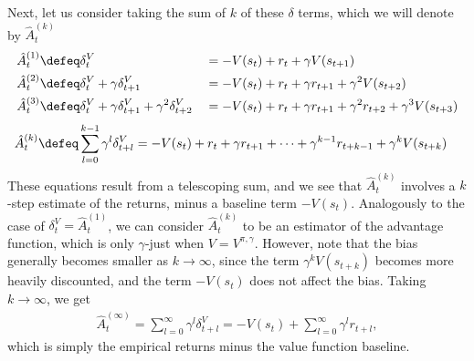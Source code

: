 \documentclass{article}
\newcommand{\dv}{\delta^V}
\newcommand{\hata}{\hat{A}}
\newcommand{\delay}{l}
\newcommand{\Vpigam}{V^{\pi,\gamma}}
\newcommand{\just}{$\gamma$-just}
\begin{document}
Next, let us consider taking the sum of $k$ of these $\delta$ terms, which we will denote by $\hata_t^{(k)}$
\begin{alignat}{2}
\hata_t^{(1)} &\defeq  \dv_{t} &&= -V(s_t) + r_t + \gamma V(s_{t+1})\\
\hata_t^{(2)} &\defeq \dv_t + \gamma \dv_{t+1} &&= -V(s_t) + r_t + \gamma r_{t+1} + \gamma^2 V(s_{t+2}) \label{a2}\\
\hata_t^{(3)} &\defeq \dv_{t} + \gamma \dv_{t+1} + \gamma^2 \dv_{t+2} &&= -V(s_t) + r_t + \gamma r_{t+1} + \gamma^2 r_{t+2} + \gamma^3 V(s_{t+3}) \label{a3}
\end{alignat}
\begin{align}
\hata_t^{(k)} &\defeq \sum_{\delay=0}^{k-1} \gamma^{\delay} \dv_{t+l} = -V(s_t) + r_t + \gamma r_{t+1} + \dots + \gamma^{k-1} r_{t+k-1} + \gamma^{k} V(s_{t+k})
\end{align}
These equations result from a telescoping sum, and we see that $\hata_t^{(k)}$ involves a $k$-step estimate of the returns, minus a baseline term $-V(s_t)$.
Analogously to the case of $\dv_t = \hata_t^{(1)}$, we can consider $\hata_t^{(k)}$ to be an estimator of the advantage function, which is only \just{} when $V = \Vpigam$. However, note that the bias generally becomes smaller as $k \rightarrow \infty$, since the term $\gamma^k V(s_{t+k})$ becomes more heavily discounted, and the term $-V(s_t)$ does not affect the bias.
Taking $k \rightarrow \infty$, we get
\begin{align}
\hata_t^{(\infty)} = \sum_{\delay=0}^{\infty} \gamma^{\delay} \dv_{t+l} = -V(s_t) + \sum_{\delay=0}^{\infty} \gamma^{\delay} r_{t+\delay},
\end{align}
which is simply the empirical returns minus the value function baseline.
\end{document}
